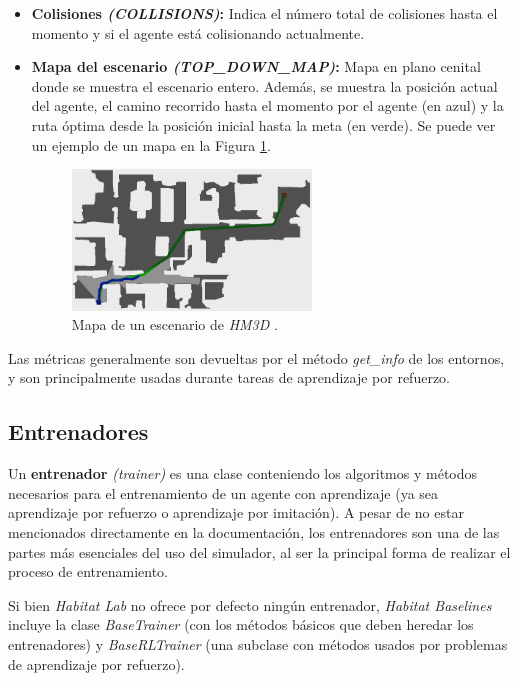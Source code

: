 \begin{itemize}
	\item \textbf{Colisiones \textit{(COLLISIONS)}:} Indica el número total de colisiones hasta el momento y si el agente está colisionando actualmente.
	\item \textbf{Mapa del escenario \textit{(TOP{\_}DOWN{\_}MAP)}:} Mapa en plano cenital donde se muestra el escenario entero. Además, se muestra la posición actual del agente, el camino recorrido hasta el momento por el agente (en azul) y la ruta óptima desde la posición inicial hasta la meta (en verde). Se puede ver un ejemplo de un mapa en la Figura \ref{fig:chap4-topdownmap}.
	
\begin{figure}[h]
    \centering
    \includegraphics[width=0.6\textwidth]{imagenes/cap4/topdownmap.png}
    \caption{Mapa de un escenario de \textit{HM3D} \cite{habitatmp3d}.}
    \label{fig:chap4-topdownmap}
\end{figure}			
	
\end{itemize}

Las métricas generalmente son devueltas por el método \textit{get{\_}info} de los entornos, y son principalmente usadas durante tareas de aprendizaje por refuerzo.

\subsection{Entrenadores}

Un \textbf{entrenador} \textit{(trainer)} es una clase conteniendo los algoritmos y métodos necesarios para el entrenamiento de un agente con aprendizaje (ya sea aprendizaje por refuerzo o aprendizaje por imitación). A pesar de no estar mencionados directamente en la documentación, los entrenadores son una de las partes más esenciales del uso del simulador, al ser la principal forma de realizar el proceso de entrenamiento.

Si bien \textit{Habitat Lab} no ofrece por defecto ningún entrenador, \textit{Habitat Baselines} incluye la clase \textit{BaseTrainer} (con los métodos básicos que deben heredar los entrenadores) y \textit{BaseRLTrainer} (una subclase con métodos usados por problemas de aprendizaje por refuerzo).

